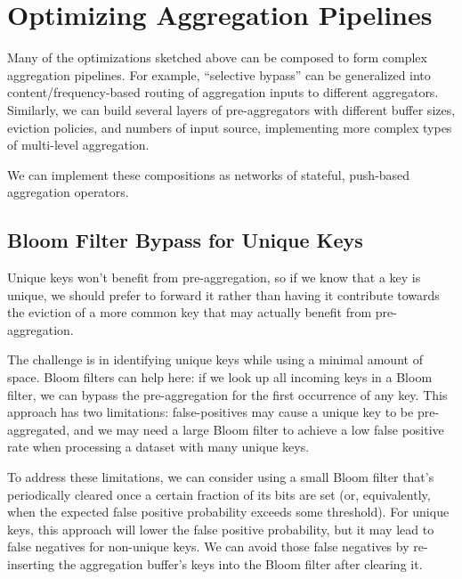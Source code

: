 \documentclass[12pt]{article}
\begin{document}



\pagebreak
\section{Optimizing Aggregation Pipelines}
Many of the optimizations sketched above can be composed to form complex
aggregation pipelines.  For example, ``selective bypass'' can be generalized
into content/frequency-based routing of aggregation inputs to different
aggregators.  Similarly, we can build several layers of pre-aggregators with
different buffer sizes, eviction policies, and numbers of input source,
implementing more complex types of multi-level aggregation.

We can implement these compositions as networks of stateful, push-based
aggregation operators.

\subsection{Bloom Filter Bypass for Unique Keys}
Unique keys won't benefit from pre-aggregation, so if we know that a key is
unique, we should prefer to forward it rather than having it contribute
towards the eviction of a more common key that may actually benefit from
pre-aggregation.

The challenge is in identifying unique keys while using a minimal amount of
space.  Bloom filters can help here: if we look up all incoming keys in
a Bloom filter, we can bypass the pre-aggregation for the first occurrence of
any key.  This approach has two limitations: false-positives may cause
a unique key to be pre-aggregated, and we may need a large Bloom filter to
achieve a low false positive rate when processing a dataset with many unique
keys.

To address these limitations, we can consider using a small Bloom filter that's
periodically cleared once a certain fraction of its bits are set (or,
equivalently, when the expected false positive probability exceeds some
threshold).  For unique keys, this approach will lower the false positive
probability, but it may lead to false negatives for non-unique keys.
We can avoid those false negatives by re-inserting the aggregation buffer's
keys into the Bloom filter after clearing it.

\end{document}

